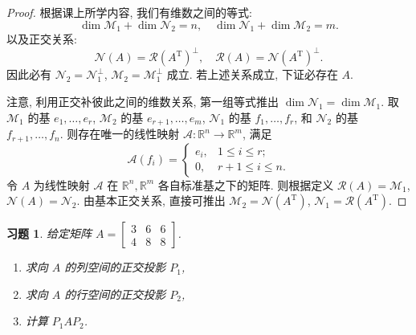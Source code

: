 \documentclass[UTF8]{ctexart}
\newtheorem{ex}[thm]{习题}
\begin{document}
\begin{proof}
  根据课上所学内容, 我们有维数之间的等式:
\[\dim \mathcal{M}_{1} + \dim \mathcal{N}_{2} = n, \quad \dim \mathcal{N}_{1} + \dim \mathcal{M}_{2} = m.\]
以及正交关系:
\[
  \mathcal{N}(A) = \mathcal{R}(A^{\mathrm{T}})^{\perp}, \quad
  \mathcal{R}(A) = \mathcal{N}(A^\mathrm{T})^{\perp}.
\]
因此必有 \(\mathcal{N}_{2} = \mathcal{N}_{1}^{\perp}\), \(\mathcal{M}_{2} = \mathcal{M}_{1}^{\perp}\) 成立.
若上述关系成立, 下证必存在 \(A\).

注意, 利用正交补彼此之间的维数关系, 第一组等式推出 \(\dim \mathcal{N}_{1} = \dim \mathcal{M}_{1}\).
取 \(\mathcal{M}_{1}\) 的基 \(e_{1},\ldots,e_{r}\), \(\mathcal{M}_{2}\) 的基 \(e_{r+1},\ldots,e_{m}\),
\(\mathcal{N}_{1}\) 的基 \(f_{1},\ldots,f_{r}\), 和 \(\mathcal{N}_{2}\) 的基 \(f_{r+1},\ldots,f_{n}\).
则存在唯一的线性映射  \(\mathscr{A}\colon\mathbb{R}^{n} \to \mathbb{R}^{m}\), 满足
\[\mathscr{A}(f_{i}) =
  \begin{cases}
    e_{i}, & 1 \leq i \leq r; \\
    0,    & r+1 \leq i  \leq n.
  \end{cases}\]
令 \(A\) 为线性映射 \(\mathscr{A}\) 在 \(\mathbb{R}^{n}, \mathbb{R}^{m}\) 各自标准基之下的矩阵.
则根据定义 \(\mathcal{R}(A) = \mathcal{M}_{1}\), \(\mathcal{N}(A) = \mathcal{N}_{2}\).
由基本正交关系, 直接可推出 \(\mathcal{M}_{2} = \mathcal{N}(A^{\mathrm{T}})\),
\(\mathcal{N}_{1} = \mathcal{R}(A^{\mathrm{T}})\).
\end{proof}

\begin{ex}
  给定矩阵 \(A = \begin{bmatrix} 3 & 6 & 6 \\ 4 & 8 & 8\end{bmatrix}\).
  \begin{enumerate}
  \item 求向 \(A\) 的列空间的正交投影 \(P_{1}\),
  \item 求向 \(A\) 的行空间的正交投影 \(P_{2}\),
  \item 计算 \(P_{1}AP_{2}\).
  \end{enumerate}
\end{ex}
\end{document}
